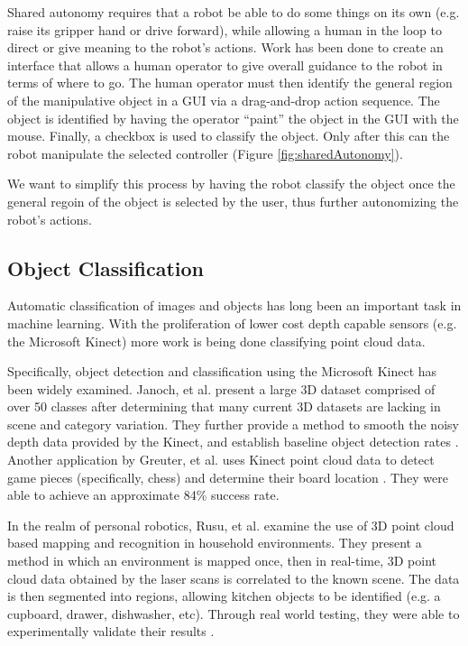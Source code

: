 \documentclass{article}
\begin{document}
Shared autonomy requires that a robot be able to do some things on its own (e.g. raise its gripper hand or drive forward), while allowing
 a human in the loop to direct or give meaning to the robot's actions. Work has been done to create an interface that
allows a human operator to give overall guidance to the robot in terms of where to go. The human operator must then identify the general region of the manipulative object in a GUI via a drag-and-drop action sequence.  The object is identified by having the operator ``paint'' the object in the GUI with the mouse.  Finally, a checkbox is used to classify the object.  Only after this can the robot manipulate the selected controller (Figure \ref{fig:sharedAutonomy})\cite{matt}. 

We want to simplify this process by having the robot classify the object once the general regoin of the object is selected by the user, thus further autonomizing the robot's actions.

\subsection{Object Classification}
Automatic classification of images and objects has long been an important task in machine learning. With the proliferation of lower cost depth capable sensors (e.g. the Microsoft Kinect) more work is being done classifying point cloud data.

Specifically, object detection and classification using the Microsoft Kinect has been widely examined. Janoch, et al. present a large 3D dataset comprised of over 50 classes after determining that many current 3D datasets are lacking in scene and category variation. They further provide a method to smooth the noisy depth data provided by the Kinect, and establish baseline object detection rates \cite{kinectWork}. Another application by Greuter, et al. uses Kinect point cloud data to detect game pieces (specifically, chess) and determine their board location \cite{eurobot}. They were able to achieve an approximate 84\% success rate.

In the realm of personal robotics, Rusu, et al. examine the use of 3D point cloud based mapping and recognition in household environments. They present a method in which an environment is mapped once, then in real-time, 3D point cloud data obtained by the laser scans is correlated to the known scene. The data is then segmented into regions, allowing kitchen objects to be identified (e.g. a cupboard, drawer, dishwasher, etc). Through real world testing, they were able to experimentally validate their results \cite{mapKitchen, mapHouse}. 
\end{document}
